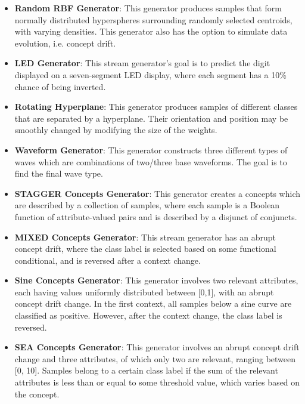 \documentclass[reqno]{vcuthesis}
\newcommand{\iitem}{\item[-]}
\numberwithin{equation}{chapter}
\begin{document}
\begin{itemize}
\iitem \textbf{Random RBF Generator}: This generator produces samples that form normally distributed hyperspheres surrounding randomly selected centroids, with varying densities. This generator also has the option to simulate data evolution, i.e. concept drift. 

\iitem  \textbf{LED Generator}: This stream generator's goal is to predict the digit displayed on a seven-segment LED display, where each segment has a 10\% chance of being inverted.

\iitem \textbf{Rotating Hyperplane}: This generator produces samples of different classes that are separated by a hyperplane. Their orientation and position may be smoothly changed by modifying the size of the weights.

\iitem \textbf{Waveform Generator}: This generator constructs three different types of waves which are combinations of two/three base waveforms. The goal is to find the final wave type.

\iitem \textbf{STAGGER Concepts Generator}: This generator creates a concepts which are described by a collection of samples, where each sample is a Boolean function of attribute-valued pairs and is described by a disjunct of conjuncts.

\iitem \textbf{MIXED Concepts Generator}: This stream generator has an abrupt concept drift, where the class label is selected based on some functional conditional, and is reversed after a context change.

\iitem \textbf{Sine Concepts Generator}: This generator involves two relevant attributes, each having values uniformly distributed between [0,1], with an abrupt concept drift change. In the first context, all samples below a sine curve are classified as positive. However, after the context change, the class label is reversed. 

\iitem \textbf{SEA Concepts Generator}: This generator involves an abrupt concept drift change and three attributes, of which only two are relevant, ranging between [0, 10]. Samples belong to a certain class label if the sum of the relevant attributes is less than or equal to some threshold value, which varies based on the concept. 
\end{itemize}
\end{document}
